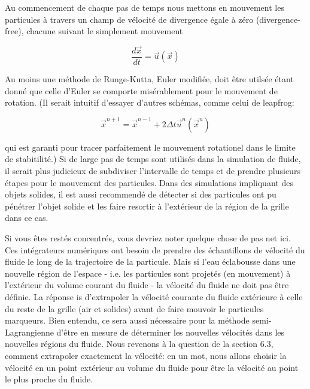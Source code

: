 \documentclass[11pt]{report}
\begin{document}
Au commencement de chaque pas de temps nous mettons en mouvement les particules à travers un champ de vélocité de divergence égale à zéro (divergence-free), chacune suivant le simplement mouvement 

\begin{equation}
\frac{d\overrightarrow{x}}{dt} = \overrightarrow{u}(\overrightarrow{x})
\end{equation}

Au moins une méthode de Runge-Kutta, Euler modifiée, doit être utilsée étant donné que celle d'Euler se comporte misérablement pour le mouvement de rotation. (Il serait intuitif d'essayer d'autres schémas, comme celui de leapfrog:

\begin{equation}
\overrightarrow{x}^{n+1} = \overrightarrow{x}^{n-1} + 2 \Delta t \overrightarrow{u}^n(\overrightarrow{x}^n)
\end{equation}

qui est garanti pour tracer parfaitement le mouvement rotationel dans le limite de stabitilité.) Si de large pas de temps sont utilisés dans la simulation de fluide, il serait plus judicieux de subdiviser l'intervalle de temps et de prendre plusieurs étapes pour le mouvement des particules. Dans des simulations impliquant des objets solides, il est aussi recommendé de détecter si des particules ont pu pénétrer l'objet solide et les faire resortir à l'extérieur de la région de la grille dans ce cas.\newline

Si vous êtes restés concentrés, vous devriez noter quelque chose de pas net ici. Ces intégrateurs numériques ont besoin de prendre des échantillons de vélocité du fluide le long de la trajectoire de la particule. Mais si l'eau éclabousse dans une nouvelle région de l'espace - i.e. les particules sont projetés (en mouvement) à l'extérieur du volume courant du fluide - la vélocité du fluide ne doit pas être définie. La réponse is d'extrapoler la vélocité courante du fluide extérieure à celle du reste de la grille (air et solides) avant de faire mouvoir le particules marqueurs. Bien entendu, ce sera aussi nécessaire pour la méthode semi-Lagrangienne d'être en mesure de déterminer les nouvelles vélocités dans les nouvelles régions du fluide. Nous revenons à la question de la section 6.3, comment extrapoler exactement la vélocité: en un mot, nous allons choisir la vélocité en un point extérieur au volume du fluide pour être la vélocité au point le plus proche du fluide.\newline
\end{document}
